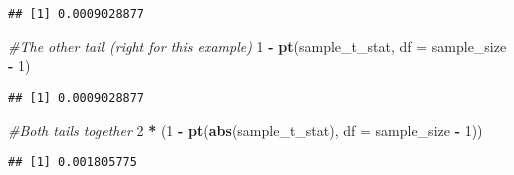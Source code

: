 \documentclass[
]{article}
\newenvironment{Shaded}{\begin{snugshade}}{\end{snugshade}}
\newcommand{\CommentTok}[1]{\textcolor[rgb]{0.56,0.35,0.01}{\textit{#1}}}
\newcommand{\DataTypeTok}[1]{\textcolor[rgb]{0.13,0.29,0.53}{#1}}
\newcommand{\DecValTok}[1]{\textcolor[rgb]{0.00,0.00,0.81}{#1}}
\newcommand{\KeywordTok}[1]{\textcolor[rgb]{0.13,0.29,0.53}{\textbf{#1}}}
\newcommand{\NormalTok}[1]{#1}
\newcommand{\OperatorTok}[1]{\textcolor[rgb]{0.81,0.36,0.00}{\textbf{#1}}}
\newcommand{\StringTok}[1]{\textcolor[rgb]{0.31,0.60,0.02}{#1}}
\begin{document}
\begin{Shaded}
\end{Shaded}

\begin{verbatim}
## [1] 0.0009028877
\end{verbatim}

\begin{Shaded}
\begin{Highlighting}[]
\CommentTok{#The other tail (right for this example)}
\DecValTok{1} \OperatorTok{-}\StringTok{ }\KeywordTok{pt}\NormalTok{(sample_t_stat, }\DataTypeTok{df =}\NormalTok{ sample_size }\OperatorTok{-}\StringTok{ }\DecValTok{1}\NormalTok{)}
\end{Highlighting}
\end{Shaded}

\begin{verbatim}
## [1] 0.0009028877
\end{verbatim}

\begin{Shaded}
\begin{Highlighting}[]
\CommentTok{#Both tails together}
\DecValTok{2} \OperatorTok{*}\StringTok{ }\NormalTok{(}\DecValTok{1} \OperatorTok{-}\StringTok{ }\KeywordTok{pt}\NormalTok{(}\KeywordTok{abs}\NormalTok{(sample_t_stat), }\DataTypeTok{df =}\NormalTok{ sample_size }\OperatorTok{-}\StringTok{ }\DecValTok{1}\NormalTok{))}
\end{Highlighting}
\end{Shaded}

\begin{verbatim}
## [1] 0.001805775
\end{verbatim}
\end{document}
